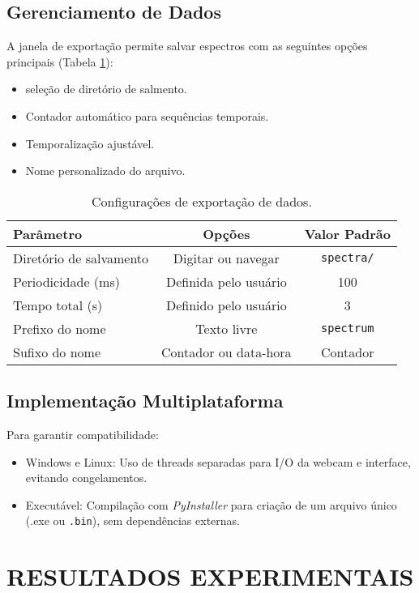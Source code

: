 \documentclass[a4paper]{ifacconf}
\begin{document}
\subsection{Gerenciamento de Dados}
A janela de exportação permite salvar espectros com as seguintes opções principais (Tabela \ref{tab:export}):
\begin{itemize}
    \item seleção de diretório de salmento.
    \item Contador automático para sequências temporais.
    \item Temporalização ajustável.
    \item Nome personalizado do arquivo.
\end{itemize}

\begin{table}[hb]
    \centering
    \caption{Configurações de exportação de dados.}
    \label{tab:export}
    \begin{tabular}{lcc}
        Parâmetro & Opções & Valor Padrão \\
        \hline
        Diretório de salvamento & Digitar ou navegar & \texttt{spectra/} \\
        Periodicidade (ms) & Definida pelo usuário & 100 \\
        Tempo total (s) & Definido pelo usuário & 3 \\
        Prefixo do nome & Texto livre & \texttt{spectrum} \\
        Sufixo do nome & Contador ou data-hora & Contador \\
        \hline
    \end{tabular}
\end{table}

\subsection{Implementação Multiplataforma}
Para garantir compatibilidade:
\begin{itemize}
    \item Windows e Linux: Uso de threads separadas para I/O da webcam e interface, evitando congelamentos.
    \item Executável: Compilação com \textit{PyInstaller} para criação de um arquivo único (.exe ou \texttt{.bin}), sem dependências externas.
\end{itemize}

\section{RESULTADOS EXPERIMENTAIS}
\label{sec:resultados}
\end{document}
